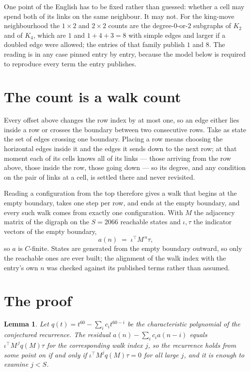 \documentclass[11pt,a4paper]{article}
\theoremstyle{plain}
\newtheorem{lemma}[theorem]{Lemma}
\theoremstyle{definition}
\begin{document}
One point of the English has to be fixed rather than guessed: whether a cell may spend both of
its links on the same neighbour. It may not. For the king-move neighbourhood the $1\times2$
and $2\times2$ counts are the degree-$0$-or-$2$ subgraphs of $K_2$ and of $K_4$, which are $1$
and $1+4+3=8$ with simple edges and larger if a doubled edge were allowed; the entries of that
family publish $1$ and $8$. The reading is in any case pinned entry by entry, because the
model below is required to reproduce every term the entry publishes.


\section{The count is a walk count}

Every offset above changes the row index by at most one, so an edge either lies inside a row
or crosses the boundary between two consecutive rows. Take as state the set of edges crossing
one boundary. Placing a row means choosing the horizontal edges inside it and the edges it
sends down to the next row; at that moment each of its cells knows all of its links --- those
arriving from the row above, those inside the row, those going down --- so its degree, and any
condition on the pair of links at a cell, is settled there and never revisited.

Reading a configuration from the top therefore gives a walk that begins at the empty boundary,
takes one step per row, and ends at the empty boundary, and every such walk comes from exactly
one configuration. With $M$ the adjacency matrix of the digraph on the $S=2066$ reachable
states and $\iota,\tau$ the indicator vectors of the empty boundary,
\[
a(n)\;=\;\iota^{\!\top}M^{\,n}\tau ,
\]
so $a$ is $C$-finite. States are generated from the empty boundary outward, so only the
reachable ones are ever built; the alignment of the walk index with the entry's own $n$ was
checked against its published terms rather than assumed.

\section{The proof}

\begin{lemma}\label{lem:crit}
Let $q(t)=t^{60}-\sum_i c_it^{60-i}$ be the characteristic polynomial of the
conjectured recurrence. The residual $a(n)-\sum_ic_ia(n-i)$ equals
$\iota^{\!\top}M^{\,j}q(M)\tau$ for the corresponding walk index $j$, so the recurrence
holds from some point on if and only if $\iota^{\!\top}M^{j}q(M)\tau=0$ for all large $j$,
and it is enough to examine $j<S$.
\end{lemma}
\end{document}
